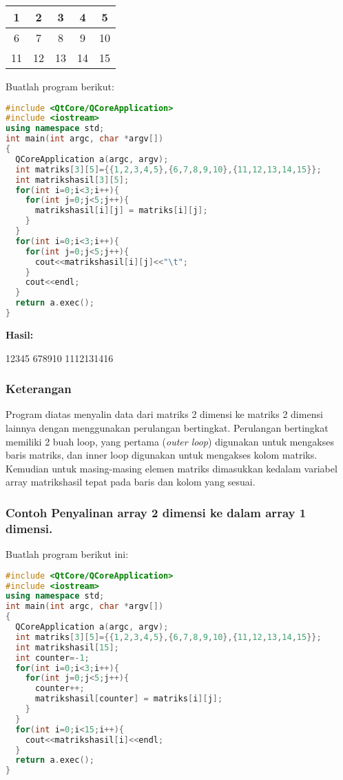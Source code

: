 \begin{tabular}{|c|c|c|c|c|}
\hline
1 & 2 & 3 & 4 & 5 \\ \hline
6 & 7 & 8 & 9 & 10 \\ \hline
11 & 12 & 13 & 14 & 15 \\ \hline

\end{tabular}

Buatlah program berikut:

\begin{lstlisting}[language=c++, caption=Penyalinan Array 2 Dimensi ke Array 2 Dimensi lainnya, label=contoh3-11]
#include <QtCore/QCoreApplication>
#include <iostream>
using namespace std;
int main(int argc, char *argv[])
{
  QCoreApplication a(argc, argv);
  int matriks[3][5]={{1,2,3,4,5},{6,7,8,9,10},{11,12,13,14,15}};
  int matrikshasil[3][5];
  for(int i=0;i<3;i++){
    for(int j=0;j<5;j++){
      matrikshasil[i][j] = matriks[i][j];
    }
  }
  for(int i=0;i<3;i++){
    for(int j=0;j<5;j++){
      cout<<matrikshasil[i][j]<<"\t";
    }
    cout<<endl;
  }
  return a.exec();
}
\end{lstlisting}

\textbf{Hasil:}

\begin{lcverbatim}
12345
678910
1112131416
\end{lcverbatim}

\subsubsection*{Keterangan}

Program diatas menyalin data dari matriks 2 dimensi ke matriks 2 dimensi
lainnya dengan menggunakan perulangan bertingkat. Perulangan bertingkat
memiliki 2 buah loop, yang pertama (\emph{outer loop}) digunakan untuk
mengakses baris matriks, dan inner loop digunakan untuk mengakses kolom
matriks. Kemudian untuk masing-masing elemen matriks dimasukkan kedalam
variabel array matrikshasil tepat pada baris dan kolom yang sesuai.

\subsubsection*{Contoh  Penyalinan array 2 dimensi ke dalam array 1 dimensi.}

Buatlah program berikut ini:

\begin{lstlisting}[language=c++, caption=Penyalinan array 2 dimensi ke dalam array 1 dimensi, label=contoh3-12]
#include <QtCore/QCoreApplication>
#include <iostream>
using namespace std;
int main(int argc, char *argv[])
{
  QCoreApplication a(argc, argv);
  int matriks[3][5]={{1,2,3,4,5},{6,7,8,9,10},{11,12,13,14,15}};
  int matrikshasil[15];
  int counter=-1;
  for(int i=0;i<3;i++){
    for(int j=0;j<5;j++){
      counter++;
      matrikshasil[counter] = matriks[i][j];
    }
  }
  for(int i=0;i<15;i++){
    cout<<matrikshasil[i]<<endl;
  }
  return a.exec();
}
\end{lstlisting}

